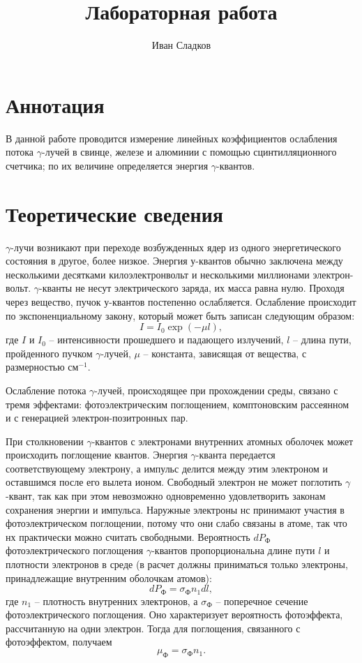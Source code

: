 \documentclass[a4paper]{article}
\title{Лабораторная работа \labnum \space \labname} %
\author{Иван Сладков}
\begin{document}
\maketitle
\thispagestyle{empty}
\section{Аннотация}
В данной работе проводится измерение линейных коэффициентов ослабления потока $ \gamma $-лучей в свинце, железе и алюминии с помощью сцинтилляционного счетчика; по
их величине определяется энергия $ \gamma $-квантов.


\section{Теоретические сведения}

$\gamma$-лучи возникают при переходе возбужденных ядер из одного энергетического состояния в другое, более низкое. Энергия у-квантов обычно заключена между несколькими десятками килоэлектронвольт и несколькими миллионами электрон-вольт. $\gamma$-кванты не несут электрического заряда, их масса равна нулю. Проходя через вещество, пучок у-квантов постепенно ослабляется. Ослабление происходит по экспоненциальному закону, который может быть записан следующим образом:
\begin{equation}\label{eq:exp}
	I = I_0 \exp(-\mu l),
\end{equation}
где $ I $ и $ I_0 $ -- интенсивности прошедшего и падающего излучений, $ l $ -- длина пути, пройденного пучком $ \gamma $-лучей, $ \mu $ -- константа, зависящая от вещества, с размерностью $ см^{-1} $.

Ослабление потока $ \gamma $-лучей, происходящее при прохождении среды, связано с тремя эффектами: фотоэлектрическим поглощением, комптоновским рассеянном и с генерацией электрон-позитронных пар.


При столкновении $ \gamma $-квантов с электронами внутренних атомных оболочек может происходить поглощение квантов. Энергия $ \gamma $-кванта передается соответствующему электрону, а импульс делится между этим электроном и оставшимся после его вылета ионом. Свободный электрон не может поглотить $ \gamma $-квант, так как при этом невозможно одновременно удовлетворить законам сохранения энергии и импульса. Наружные электроны нс принимают участия в фотоэлектрическом поглощении, потому что они слабо связаны в атоме, так что нх практически можно считать свободными. Вероятность $ d P_Ф $ фотоэлектрического поглощения $ \gamma $-квантов пропорциональна длине пути $ l $ и плотности электронов в среде (в расчет должны приниматься только электроны, принадлежащие внутренним оболочкам атомов):
\begin{equation*}\label{eq:dpf}
	d P_Ф = \sigma_Ф n_1 d l,
\end{equation*}
где $ n_1 $ -- плотность внутренних электронов, а $ \sigma_Ф $ -- поперечное сечение фотоэлектрического поглощения. Оно характеризует
вероятность фотоэффекта, рассчитанную на одни электрон.
 Тогда для поглощения, связанного с фотоэффектом, получаем
\begin{equation*}\label{key}
	\mu_Ф = \sigma_Ф n_1.
\end{equation*}
\end{document}
